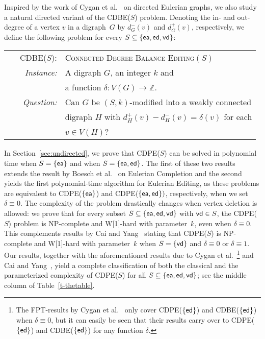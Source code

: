 \documentclass[11pt]{llncs}
\newcommand{\vd}{{\sf vd}}
\newcommand{\ed}{{\sf ed}}
\newcommand{\ea}{{\sf ea}}
\newcommand{\cdpe}{{\sc CDPE}}
\newcommand{\cdbe}{{\sc CDBE}}
\newcommand{\NP}{{\sf NP}}
\newcommand{\FPT}{{\sf FPT}}
\newcommand{\W}{{\sf W[1]}}
\begin{document}
Inspired by the work of Cygan et al.~\cite{CyganMPPS14} on directed Eulerian
graphs, we also study a natural directed variant of the \cdbe($S$) problem.
Denoting the in- and out-degree of a vertex $v$ in a digraph~$G$ by $d_G^-(v)$
and $d_G^+(v)$, respectively, we define the following problem for every
$S\subseteq\{\ea, \ed, \vd\}$:
\begin{center}
\begin{boxedminipage}{.99\textwidth}
\begin{tabular}{rl}
\textsc{\cdbe($S$):}   & \textsc{Connected Degree Balance Editing$(S)$}\\
\textit{~~~~Instance:} & A digraph $G$, an integer $k$ and\\
                       & a function $\delta\colon V(G)\rightarrow\mathbb{Z}$.\\
\textit{Question:}     & Can $G$ be $(S,k)$-modified into a weakly connected\\& digraph $H$
                        with $d_{H}^+(v)-d_{H}^-(v)=\delta(v)$ for each\\
& $v\in V(H)$?
\end{tabular}
\end{boxedminipage}
\end{center}

In Section~\ref{sec:undirected}, we prove that \cdpe($S$) can be solved in polynomial time when $S=\{\ea\}$  
and when $S=\{\ea,\ed\}$.
The first of these two results extends the result by Boesch et
al.~\cite{BoeschST77} on {\sc Eulerian Completion}
 and the second yields the first
polynomial-time algorithm for {\sc Eulerian Editing}, as these problems are
equivalent to \cdpe($\{\ea\}$) and \cdpe($\{\ea,\ed\})$, respectively, when we
set $\delta\equiv 0$. 
The complexity of the problem drastically changes when vertex deletion is allowed: we prove that for every subset $S\subseteq
\{\ea,\ed,\vd\}$ with $\vd\in S$, the \cdpe($S$) problem is
\NP-complete and \W-hard with parameter~$k$, even when $\delta\equiv 0$. 
This complements results by Cai and Yang~\cite{CaiY11} stating that \cdpe($S$)
is \NP-complete and \W-hard with parameter~$k$ when $S=\{\vd\}$
and $\delta\equiv 0$ or $\delta\equiv 1$. 
Our results, together with the aforementioned results due to Cygan et al.~\cite{CyganMPPS14}\footnote{The \FPT-results
by Cygan et al.~\cite{CyganMPPS14} only cover \cdpe($\{\ed\}$) and
\cdbe($\{\ed\}$) when $\delta\equiv 0$, but it can easily be seen that their
results carry over to \cdpe($\{\ed\}$) and \cdbe($\{\ed\}$) for any function
$\delta$.} and Cai and
Yang~\cite{CaiY11}, yield a complete classification of both the classical and the parameterized
complexity of \cdpe($S$) for all $S\subseteq \{\ea,\ed,\vd\}$; 
see the middle column of Table~\ref{t-thetable}. 
\end{document}
